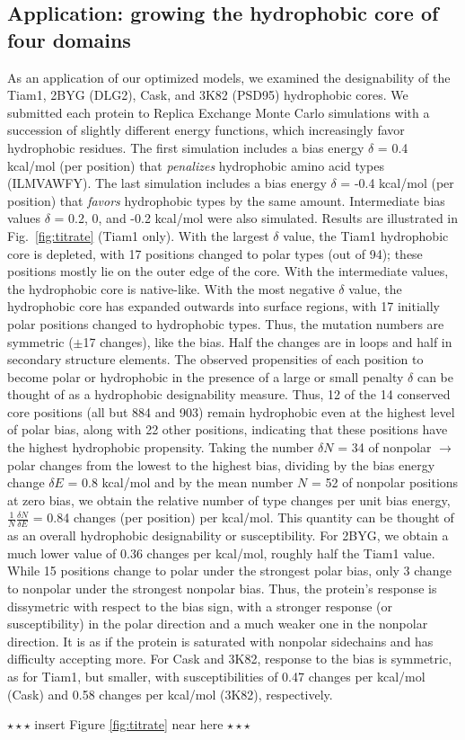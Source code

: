\documentclass[12pt]{article}
\begin{document}
\subsection{Application: growing the hydrophobic core of four domains}
As an application of our optimized models, we examined the designability of the Tiam1, 2BYG (DLG2), Cask, and 3K82 (PSD95) hydrophobic
cores. We submitted each protein to Replica Exchange Monte Carlo simulations with a succession of slightly different energy functions,
which increasingly favor hydrophobic residues. The first simulation includes a bias energy $\delta$ = 0.4 kcal/mol (per position) that
{\it penalizes} hydrophobic amino acid types (ILMVAWFY). The last simulation includes a bias energy $\delta$ = -0.4 kcal/mol (per
position) that {\it favors} hydrophobic types by the same amount. Intermediate bias values $\delta$ = 0.2, 0, and -0.2 kcal/mol
were also simulated. Results are illustrated in Fig.\ \ref{fig:titrate} (Tiam1 only). With the largest $\delta$ value, the Tiam1
hydrophobic core is depleted, with 17 positions changed to polar types (out of 94); these positions mostly lie on the outer edge
of the core. With the intermediate values, the hydrophobic core is native-like. With the most negative $\delta$ value, the hydrophobic
core has expanded outwards into surface regions, with 17 initially polar positions changed to hydrophobic types. Thus, the mutation
numbers are symmetric ($\pm$17 changes), like the bias. Half the changes are in loops and half in secondary structure elements. The
observed propensities of each position to become polar or hydrophobic in the presence of a large or small penalty $\delta$ can be
thought of as a hydrophobic designability measure. Thus, 12 of the 14 conserved core positions (all but 884 and 903) remain hydrophobic
even at the highest level of polar bias, along with 22 other positions, indicating that these positions have the highest hydrophobic
propensity. Taking the number $\delta N$ = 34 of nonpolar $\rightarrow$ polar changes from the lowest to the highest bias, dividing
by the bias energy change $\delta E$ = 0.8 kcal/mol and by the mean number $N$ = 52 of nonpolar positions at zero bias, we obtain the
relative number of type changes per unit bias energy, $\frac{1}{N}\frac{\delta N}{\delta E}$ = 0.84 changes (per position) per kcal/mol.
This quantity can be thought of as an overall hydrophobic designability or susceptibility. For 2BYG, we obtain a much lower value of
0.36 changes per kcal/mol, roughly half the Tiam1 value. While 15 positions change to polar under the strongest polar bias, only 3
change to nonpolar under the strongest nonpolar bias. Thus, the protein's response is dissymetric with respect to the bias sign, with
a stronger response (or susceptibility) in the polar direction and a much weaker one in the nonpolar direction. It is as if the protein
is saturated with nonpolar sidechains and has difficulty accepting more. For Cask and 3K82, response to the bias is symmetric, as for
Tiam1, but smaller, with susceptibilities of 0.47 changes per kcal/mol (Cask) and 0.58 changes per kcal/mol (3K82), respectively.
\begin{center} $\star \star \star$ insert Figure \ref{fig:titrate} near here $\star \star \star$ \end{center}
\end{document}
